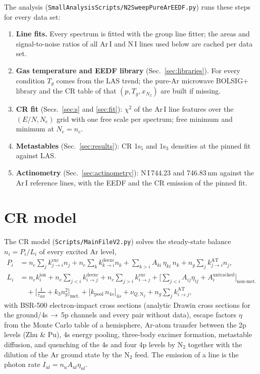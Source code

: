 \documentclass[11pt]{article}
\newcommand{\EN}{E/N}
\newcommand{\nc}{n_c}
\begin{document}
The analysis (\texttt{SmallAnalysisScripts/N2SweepPureArEEDF.py}) runs these steps for every data set:
\begin{enumerate}
\item \textbf{Line fits.} Every spectrum is fitted with the group line fitter; the areas and signal-to-noise
  ratios of all Ar\,I and N\,I lines used below are cached per data set.
\item \textbf{Gas temperature and EEDF library} (Sec.~\ref{sec:libraries}). For every condition $T_g$ comes from
  the LAS trend; the pure-Ar microwave BOLSIG+ library and the CR table of that $(p, T_g, x_{N_2})$ are built if
  missing.
\item \textbf{CR fit} (Secs.~\ref{sec:s} and \ref{sec:fit}): $\chi^2$ of the Ar\,I line features over the
  $(\EN, N_e)$ grid with one free scale per spectrum; free minimum and minimum at $N_e=\nc$.
\item \textbf{Metastables} (Sec.~\ref{sec:results}): CR 1s$_5$ and 1s$_3$ densities at the pinned fit against LAS.
\item \textbf{Actinometry} (Sec.~\ref{sec:actinometry}): N\,I\,744.23 and 746.83\,nm against the Ar\,I reference
  lines, with the EEDF and the CR emission of the pinned fit.
\end{enumerate}

\section{CR model}
The CR model (\texttt{Scripts/MainFileV2.py}) solves the steady-state balance $n_i = P_i/L_i$ of every excited
Ar level,
\begin{align}
P_i &= n_e \sum_j k^{\mathrm{exc}}_{j\to i} n_j + n_e \sum_k k^{\mathrm{deexc}}_{k\to i} n_k
      + \sum_{k>i} A_{ki}\,\eta_{ki}\, n_k + n_g \sum_j k^{\mathrm{AT}}_{j\to i} n_j, \\
L_i &= n_e k^{\mathrm{ion}}_i + n_e \sum_{j<i} k^{\mathrm{deexc}}_{i\to j} + n_e \sum_{j>i} k^{\mathrm{exc}}_{i\to j}
      + \Big[\sum_{j<i} A_{ij}\eta_{ij} + A_i^{\mathrm{untracked}}\Big]_{\text{non-met.}} \nonumber\\
    &\quad + \Big[\frac{1}{\tau_{\mathrm{diff}}} + k_3 n_g^2\Big]_{\text{met.}}
      + \big[k_{\mathrm{pool}}\, n_{4s}\big]_{4s}
      + \nu_{Q,\mathrm{N_2}} + n_g \sum_j k^{\mathrm{AT}}_{i\to j},
\end{align}
with BSR-500 electron-impact cross sections (analytic Drawin cross sections for the ground/4s\,$\to$\,5p channels
and every pair without data), escape factors $\eta$ from the Monte Carlo table of a hemisphere, Ar-atom transfer
between the 2p levels (Zhu \& Pu), 4s energy pooling, three-body excimer formation, metastable diffusion, and
quenching of the 4s and four 4p levels by N$_2$ together with the dilution of the Ar ground state by the N$_2$
feed. The emission of a line is the photon rate $I_{ul} = n_u A_{ul}\eta_{ul}$.
\end{document}
